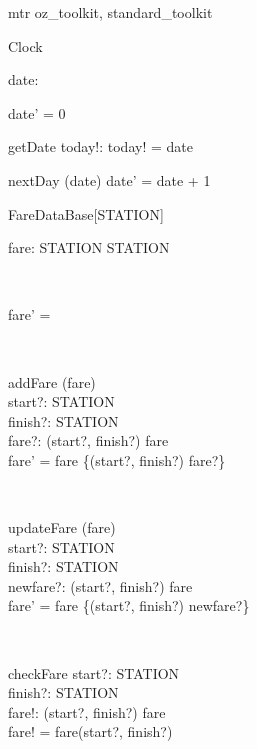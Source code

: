 \begin{zsection}
  \SECTION mtr \parents oz\_toolkit, standard\_toolkit
\end{zsection}

\zedsize{\small}
\begin{class}{Clock}
\also
\begin{state}
date:  \nat
\end{state}
\begin{init}
date' = 0\end{init}
\begin{op}{getDate}
today!:  \nat  
\where
today! = date
\end{op}
\begin{op}{nextDay}
\Delta (date)
\where
date' = date + 1
\end{op} 
\end{class} 

\begin{class}{FareDataBase}[STATION]
\also
\begin{state}
fare: STATION \cross STATION \pfun  \nat  
\end{state} \\ 
\begin{init}
fare' = \emptyset\end{init} \\ 
\begin{op}{addFare}
\Delta (fare)\\
start?: STATION \\ 
finish?: STATION \\ 
fare?:  \nat  
\where
(start?, finish?) \notin  \dom fare \\ 
fare' = fare \cup \{(start?, finish?) \mapsto fare?\} \\ 
\end{op} \\ 
\begin{op}{updateFare}
\Delta (fare)\\
start?: STATION \\ 
finish?: STATION \\ 
newfare?:  \nat  
\where
 (start?, finish?) \in  \dom fare \\ 
fare' = fare \oplus \{(start?, finish?) \mapsto newfare?\} \\ 
\end{op} \\ 
\begin{op}{checkFare}
start?: STATION \\ 
finish?: STATION \\ 
fare!:  \nat  
\where
 (start?, finish?) \in  \dom fare \\ 
fare! = fare(start?, finish?)
\end{op} 
\end{class} 


